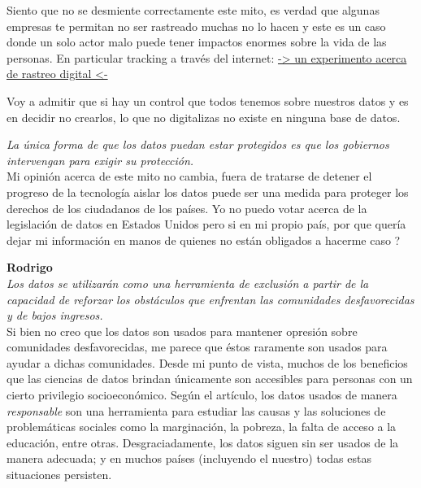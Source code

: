 \documentclass[12pt,a4paper]{article}
\begin{document}
\begin{enumerate}
\begin{enumerate}
				Siento que no se desmiente correctamente este
				mito, es verdad que algunas empresas te permitan
				no ser rastreado muchas no lo hacen y este es
				un caso donde un solo actor malo
				puede tener impactos enormes sobre la vida de
				las personas. En particular tracking
				a través del internet: \href{https://coveryourtracks.eff.org/}{-> un experimento acerca de rastreo digital <-}

				Voy a admitir que si hay un control que todos
				tenemos sobre nuestros datos y es en decidir no
				crearlos, lo que no digitalizas no existe
				en ninguna base de datos.

				\textit{La única forma de que los datos puedan estar protegidos es que
				los gobiernos intervengan para exigir su protección.}\\

				Mi opinión acerca de este mito no cambia,
				fuera de tratarse de detener el progreso de la tecnología
				aislar los datos puede ser una medida para proteger los
				derechos de los ciudadanos de los países.
				Yo no puedo votar acerca de la legislación de datos
				en Estados Unidos pero si en mi propio país, por que
				quería dejar mi información en manos de quienes no
				están obligados a hacerme caso ?
				
				\textbf{Rodrigo}\\
				\textit {Los datos se utilizarán como una herramienta de exclusión a 
				partir de la capacidad de reforzar los obstáculos que enfrentan 
				las comunidades desfavorecidas y de bajos ingresos.} \\
				Si bien no creo que los datos son usados para mantener opresión sobre 
				comunidades desfavorecidas, me parece que éstos raramente son usados para
				ayudar a dichas comunidades. Desde mi punto de vista, muchos de los beneficios 
				que las ciencias de datos brindan únicamente son accesibles para personas con un 
				cierto privilegio socioeconómico. Según el artículo, los datos usados de manera 
				\textit{responsable} son una herramienta para estudiar las causas y las soluciones 
				de problemáticas sociales como la marginación, la pobreza, la falta de acceso a la educación,
				entre otras. Desgraciadamente, los datos siguen sin ser usados de la manera adecuada; 
				y en muchos países (incluyendo el nuestro) todas estas situaciones persisten. 
				

\end{enumerate}
\end{enumerate}
\end{document}
